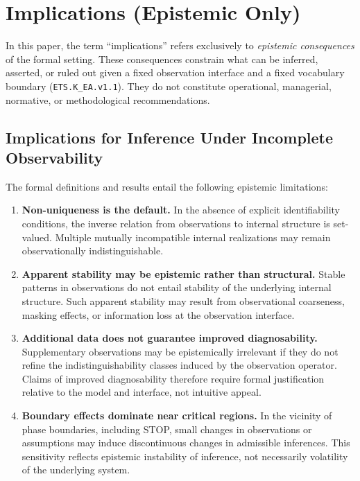﻿\section{Implications (Epistemic Only)}
\label{sec:implications}

In this paper, the term ``implications'' refers exclusively to \emph{epistemic
consequences} of the formal setting.
These consequences constrain what can be inferred, asserted, or ruled out given
a fixed observation interface and a fixed vocabulary boundary
(\texttt{ETS.K\_EA.v1.1}).
They do not constitute operational, managerial, normative, or methodological
recommendations.

\subsection{Implications for Inference Under Incomplete Observability}
\label{subsec:imp-incomplete-observability}

The formal definitions and results entail the following epistemic limitations:

\begin{enumerate}
  \item \textbf{Non-uniqueness is the default.}
  In the absence of explicit identifiability conditions, the inverse relation
  from observations to internal structure is set-valued.
  Multiple mutually incompatible internal realizations may remain
  observationally indistinguishable.

  \item \textbf{Apparent stability may be epistemic rather than structural.}
  Stable patterns in observations do not entail stability of the underlying
  internal structure.
  Such apparent stability may result from observational coarseness, masking
  effects, or information loss at the observation interface.

  \item \textbf{Additional data does not guarantee improved diagnosability.}
  Supplementary observations may be epistemically irrelevant if they do not
  refine the indistinguishability classes induced by the observation operator.
  Claims of improved diagnosability therefore require formal justification
  relative to the model and interface, not intuitive appeal.

  \item \textbf{Boundary effects dominate near critical regions.}
  In the vicinity of phase boundaries, including STOP, small changes in
  observations or assumptions may induce discontinuous changes in admissible
  inferences.
  This sensitivity reflects epistemic instability of inference, not necessarily
  volatility of the underlying system.
\end{enumerate}

